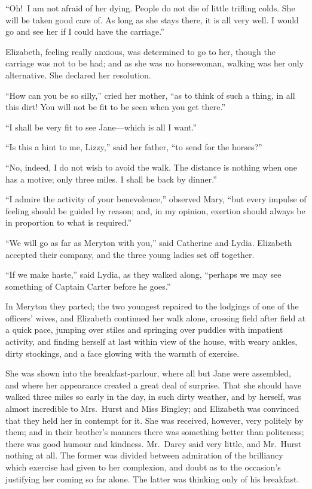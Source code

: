 \documentclass[12pt,english,oneside]{book}
\begin{document}
{}``Oh!\ I am not afraid of her dying. People do not die of little
trifling colds. She will be taken good care of. As long as she stays
there, it is all very well. I would go and see her if I could have
the carriage.''

Elizabeth, feeling really anxious, was determined to go to her, though
the carriage was not to be had; and as she was no horsewoman, walking
was her only alternative. She declared her resolution.

{}``How can you be so silly,'' cried her mother, {}``as to think
of such a thing, in all this dirt! You will not be fit to be seen
when you get there.''

{}``I shall be very fit to see Jane\mbox{---}which is all I want.''

{}``Is this a hint to me, Lizzy,'' said her father, {}``to send
for the horses?''\ 

{}``No, indeed, I do not wish to avoid the walk. The distance is
nothing when one has a motive; only three miles. I shall be back by
dinner.''

{}``I admire the activity of your benevolence,'' observed Mary,
{}``but every impulse of feeling should be guided by reason; and,
in my opinion, exertion should always be in proportion to what is
required.''

{}``We will go as far as Meryton with you,'' said Catherine and
Lydia. Elizabeth accepted their company, and the three young ladies
set off together.

{}``If we make haste,'' said Lydia, as they walked along, {}``perhaps
we may see something of Captain Carter before he goes.''

In Meryton they parted; the two youngest repaired to the lodgings
of one of the officers' wives, and Elizabeth continued her walk alone,
crossing field after field at a quick pace, jumping over stiles and
springing over puddles with impatient activity, and finding herself
at last within view of the house, with weary ankles, dirty stockings,
and a face glowing with the warmth of exercise.

She was shown into the breakfast-parlour, where all but Jane were
assembled, and where her appearance created a great deal of surprise.
That she should have walked three miles so early in the day, in such
dirty weather, and by herself, was almost incredible to Mrs.\ Hurst
and Miss Bingley; and Elizabeth was convinced that they held her in
contempt for it. She was received, however, very politely by them;
and in their brother's manners there was something better than politeness;
there was good humour and kindness. Mr.\ Darcy said very little,
and Mr.\ Hurst nothing at all. The former was divided between admiration
of the brilliancy which exercise had given to her complexion, and
doubt as to the occasion's justifying her coming so far alone. The
latter was thinking only of his breakfast.
\end{document}
